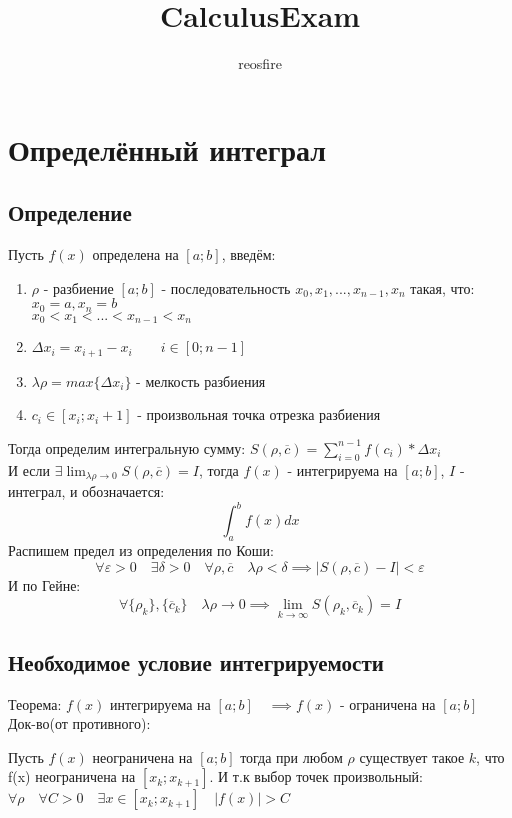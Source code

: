 \documentclass[11pt]{article}
\title{CalculusExam}
\author{reosfire}
\begin{document}
    \section{Определённый интеграл}
        \subsection{Определение}
        Пусть $f(x)$ определена на $[a; b]$, введём:
        \begin{enumerate}
            \item $\rho$ - разбиение $[a; b]$ - последовательность $x_0, x_1, ..., x_{n - 1}, x_n$ такая, что:\\
             $x_0 = a, x_n = b$\\
             $x_0 < x_1 < ... < x_{n - 1} < x_n$
            \item $\Delta x_i = x_{i + 1} - x_i \qquad i \in[0; n - 1]$
            \item $\lambda \rho = max\{\Delta x_i\}$ - мелкость разбиения
            \item $c_i \in [x_i; x_i + 1]$ - произвольная точка отрезка разбиения
        \end{enumerate}
        Тогда определим интегральную сумму:
        $S(\rho, \overline{c}) = \sum_{i=0}^{n-1} f(c_i)*\Delta x_i$\\
        И если $\exists \lim_{\lambda \rho \to 0} S(\rho, \overline{c}) = I$,
        тогда $f(x)$ - интегрируема на $[a; b]$, $I$ - интеграл, и обозначается: \[\int_{a}^{b}f(x)dx\]
        Распишем предел из определения по Коши:
        \[\forall \varepsilon > 0 \quad \exists \delta > 0 \quad \forall \rho, \overline{c} \quad \lambda\rho < \delta \implies |S(\rho, \overline{c}) - I| < \varepsilon\]
        И по Гейне:
        \[\forall \{\rho_k\}, \{\overline{c}_k\} \quad \lambda\rho \to 0 \implies \lim_{k \to \infty} S(\rho_k, \overline{c}_k) = I\]

        \subsection{Необходимое условие интегрируемости}
        Теорема: $f(x)$ интегрируема на $[a; b] \quad \implies f(x)$ - ограничена на $[a; b]$\\
        Док-во(от противного):

        Пусть $f(x)$ неограничена на $[a; b]$ тогда при любом $\rho$ существует такое $k$, что f(x) неограничена на $[x_k; x_{k + 1}]$.
        И т.к выбор точек произвольный: $\forall \rho \quad \forall C > 0 \quad \exists x \in [x_k; x_{k + 1}] \quad |f(x)| > C$
\end{document}
